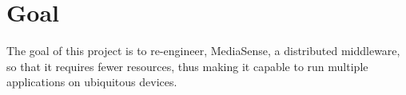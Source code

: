 \section{Goal}
The goal of this project is to re-engineer, MediaSense, a distributed middleware, so that it requires fewer resources, thus making it capable to run multiple applications on ubiquitous devices. 
